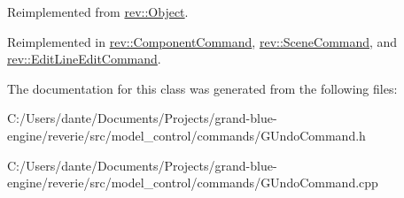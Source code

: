 Reimplemented from \mbox{\hyperlink{classrev_1_1_object_aaeb638d3e10f361c56c211a318a27f3d}{rev\+::\+Object}}.



Reimplemented in \mbox{\hyperlink{classrev_1_1_component_command_a7b4e11189228c9d9e5ff81598cb325f6}{rev\+::\+Component\+Command}}, \mbox{\hyperlink{classrev_1_1_scene_command_a8914ef927fc5bcf9071ab857c4c636a4}{rev\+::\+Scene\+Command}}, and \mbox{\hyperlink{classrev_1_1_edit_line_edit_command_a5289fd61a70c28475698a5f4cf30753b}{rev\+::\+Edit\+Line\+Edit\+Command}}.



The documentation for this class was generated from the following files\+:\begin{DoxyCompactItemize}
\item 
C\+:/\+Users/dante/\+Documents/\+Projects/grand-\/blue-\/engine/reverie/src/model\+\_\+control/commands/G\+Undo\+Command.\+h\item 
C\+:/\+Users/dante/\+Documents/\+Projects/grand-\/blue-\/engine/reverie/src/model\+\_\+control/commands/G\+Undo\+Command.\+cpp\end{DoxyCompactItemize}
